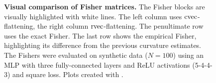 \begin{figure}[!h]
\begin{minipage}[t]{0.49\linewidth}
  \end{minipage}
  \caption{\textbf{Visual comparison of Fisher matrices.}
    The Fisher blocks are visually highlighted with white lines.
    The left column uses $\operatorname{cvec}$-flattening, the right column $\operatorname{rvec}$-flattening.
    The penultimate row uses the exact Fisher.
    The last row shows the empirical Fisher, highlighting its difference from the previous curvature estimates.
    The Fishers were evaluated on synthetic data ($N=100$) using an MLP with three fully-connected layers and ReLU activations (5-4-4-3) and square loss.
    Plots created with .
  }\label{fig:visual-comparison-mc-empirical-fisher}
\end{figure}

